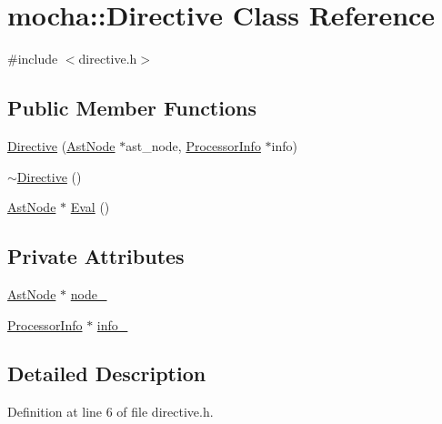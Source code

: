 \hypertarget{classmocha_1_1_directive}{
\section{mocha::Directive Class Reference}
\label{classmocha_1_1_directive}
}


{\ttfamily \#include $<$directive.h$>$}

\subsection*{Public Member Functions}
\begin{DoxyCompactItemize}
\item 
\hyperlink{classmocha_1_1_directive_a432ea46fd22197b7996a8c07ebd5c938}{Directive} (\hyperlink{classmocha_1_1_ast_node}{AstNode} $\ast$ast\_\-node, \hyperlink{classmocha_1_1_processor_info}{ProcessorInfo} $\ast$info)
\item 
\hyperlink{classmocha_1_1_directive_a15fc75ff1e7157559361c449dabd9de5}{$\sim$Directive} ()
\item 
\hyperlink{classmocha_1_1_ast_node}{AstNode} $\ast$ \hyperlink{classmocha_1_1_directive_af1d6b0a5a016de544a37c868733da0ba}{Eval} ()
\end{DoxyCompactItemize}
\subsection*{Private Attributes}
\begin{DoxyCompactItemize}
\item 
\hyperlink{classmocha_1_1_ast_node}{AstNode} $\ast$ \hyperlink{classmocha_1_1_directive_aa2cda5bc28126665c93f88ae11996697}{node\_\-}
\item 
\hyperlink{classmocha_1_1_processor_info}{ProcessorInfo} $\ast$ \hyperlink{classmocha_1_1_directive_ae14798b3b58438e68d013c881eb17e6a}{info\_\-}
\end{DoxyCompactItemize}


\subsection{Detailed Description}


Definition at line 6 of file directive.h.



